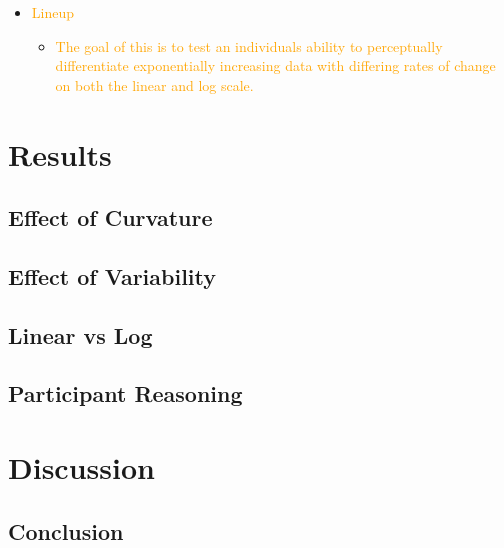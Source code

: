 \documentclass[]{interact}
\theoremstyle{plain}%
\theoremstyle{definition}
\theoremstyle{remark}
\begin{document}
\begin{itemize}
\item
  \textcolor{Orange}{Lineup}

  \begin{itemize}
  \item
    \textcolor{Orange}{The goal of this is to test an individuals ability to perceptually differentiate exponentially increasing data with differing rates of change on both the linear and log scale.}
  \end{itemize}
\end{itemize}

\hypertarget{results}{%
\section{Results}\label{results}}

\hypertarget{effect-of-curvature}{%
\subsection{Effect of Curvature}\label{effect-of-curvature}}

\hypertarget{effect-of-variability}{%
\subsection{Effect of Variability}\label{effect-of-variability}}

\hypertarget{linear-vs-log}{%
\subsection{Linear vs Log}\label{linear-vs-log}}

\hypertarget{participant-reasoning}{%
\subsection{Participant Reasoning}\label{participant-reasoning}}

\hypertarget{discussion}{%
\section{Discussion}\label{discussion}}

\hypertarget{conclusion}{%
\subsection{Conclusion}\label{conclusion}}
\end{document}
